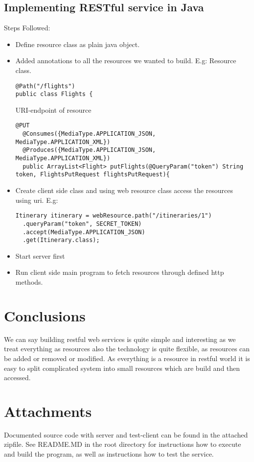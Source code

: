 \documentclass[a4paper, 11pt]{article}
\begin{document}
\subsection*{Implementing RESTful service in Java}
Steps Followed:
\begin{itemize}
\item Define resource class as plain java object. 
\item Added annotations to all the resources we wanted to build. E.g:
Resource class.
 \begin{lstlisting}[frame=single,style=java]
@Path("/flights")
public class Flights {
\end{lstlisting}
URI-endpoint of resource
\begin{lstlisting}[frame=single,style=java]
  @PUT
  @Consumes({MediaType.APPLICATION_JSON, MediaType.APPLICATION_XML})
  @Produces({MediaType.APPLICATION_JSON, MediaType.APPLICATION_XML})
  public ArrayList<Flight> putFlights(@QueryParam("token") String token, FlightsPutRequest flightsPutRequest){
\end{lstlisting}
\item Create client side class and using web resource class access the resources using uri. E.g:
\begin{lstlisting}[frame=single,style=java]
  Itinerary itinerary = webResource.path("/itineraries/1")
  .queryParam("token", SECRET_TOKEN)
  .accept(MediaType.APPLICATION_JSON)
  .get(Itinerary.class);
\end{lstlisting} 
\item Start server first 
\item Run client side main program to fetch resources through defined http methods.
\end{itemize}
\section*{Conclusions}
We can say building restful web services is quite simple and interesting as we treat everything as resources also the technology is quite flexible, as resources can be added or removed or modified. As everything is a resource in restful world it is easy to split complicated system into small resources which are build and then accessed.
\section*{Attachments}
Documented source code with server and test-client can be found in the attached zipfile. See README.MD in the root directory for instructions how to execute and build the program, as well as instructions how to test the service.

{}

\end{document}
